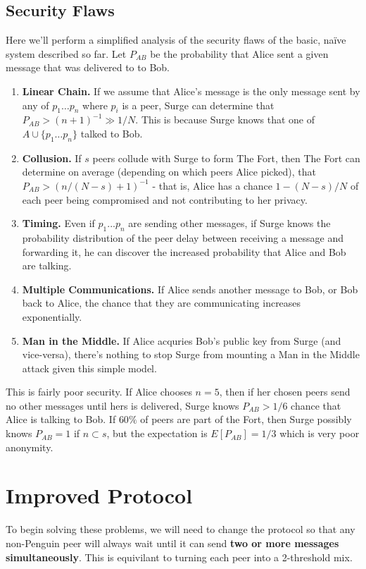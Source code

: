 \documentclass[twocolumn,11pt,english]{article}
\begin{document}
\subsection{Security Flaws}
Here we'll perform a simplified analysis of the security flaws of the basic, na\"ive system described so far. 
Let $P_{AB}$ be the probability that Alice sent a given message that was delivered to to Bob. 
\begin{enumerate}
\item\textbf{Linear Chain.} If we assume that Alice's message is the only message sent by any of $p_1 \ldots p_n$ where $p_i$ is a peer, Surge can determine that $P_{AB} > (n+1)^{-1} \gg 1/N$. This is because Surge knows that one of $A \cup \{p_1 \ldots p_n\}$ talked to Bob.
\item\textbf{Collusion.} If $s$ peers collude with Surge to form The Fort, then The Fort can determine on average (depending on which peers Alice picked), that $P_{AB} > (n/(N-s)+1)^{-1}$ - that is, Alice has a chance $1 - (N-s)/N$ of each peer being compromised and not contributing to her privacy.
\item\textbf{Timing.} Even if $p_1 ... p_n$ are sending other messages, if Surge knows the probability distribution of the peer delay between receiving a message and forwarding it, he can discover the increased probability that Alice and Bob are talking. 
\item\textbf{Multiple Communications.} If Alice sends another message to Bob, or Bob back to Alice, the chance that they are communicating increases exponentially. 
\item\textbf{Man in the Middle.} If Alice acquries Bob's public key from Surge (and vice-versa), there's nothing to stop Surge from mounting a Man in the Middle attack given this simple model. 
\end{enumerate}
This is fairly poor security. If Alice chooses $n = 5$, then if her chosen peers send no other messages until hers is delivered, Surge knows $P_{AB} > 1/6$ chance that Alice is talking to Bob. If $60\%$ of peers are part of the Fort, then Surge possibly knows $P_{AB} = 1$ if $n \subset s$, but the expectation is $E[P_{AB}] = 1/3$ which is very poor anonymity.

\section{Improved Protocol}
To begin solving these problems, we will need to change the protocol so that any non-Penguin peer will always wait until it can send \textbf{two or more messages simultaneously}. This is equivilant to turning each peer into a 2-threshold mix. \cite{trickle02}
\end{document}
